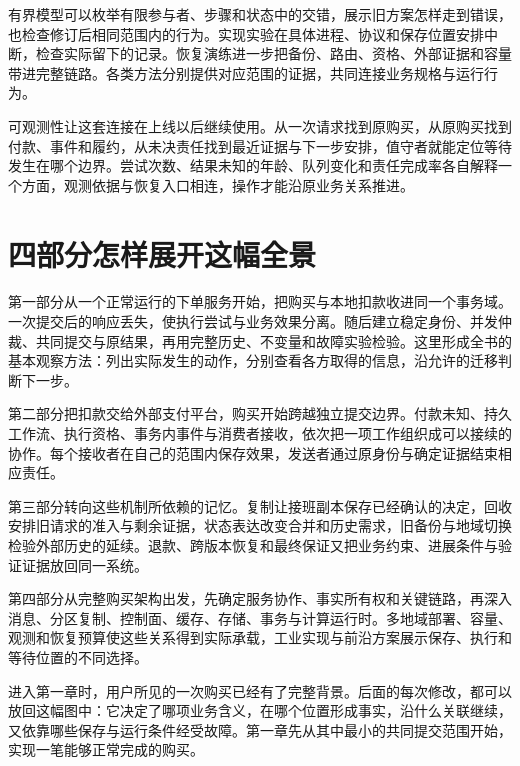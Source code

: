 有界模型可以枚举有限参与者、步骤和状态中的交错，展示旧方案怎样走到错误，也检查修订后相同范围内的行为。实现实验在具体进程、协议和保存位置安排中断，检查实际留下的记录。恢复演练进一步把备份、路由、资格、外部证据和容量带进完整链路。各类方法分别提供对应范围的证据，共同连接业务规格与运行行为。

可观测性让这套连接在上线以后继续使用。从一次请求找到原购买，从原购买找到付款、事件和履约，从未决责任找到最近证据与下一步安排，值守者就能定位等待发生在哪个边界。尝试次数、结果未知的年龄、队列变化和责任完成率各自解释一个方面，观测依据与恢复入口相连，操作才能沿原业务关系推进。

\section*{四部分怎样展开这幅全景}

第一部分从一个正常运行的下单服务开始，把购买与本地扣款收进同一个事务域。一次提交后的响应丢失，使执行尝试与业务效果分离。随后建立稳定身份、并发仲裁、共同提交与原结果，再用完整历史、不变量和故障实验检验。这里形成全书的基本观察方法：列出实际发生的动作，分别查看各方取得的信息，沿允许的迁移判断下一步。

第二部分把扣款交给外部支付平台，购买开始跨越独立提交边界。付款未知、持久工作流、执行资格、事务内事件与消费者接收，依次把一项工作组织成可以接续的协作。每个接收者在自己的范围内保存效果，发送者通过原身份与确定证据结束相应责任。

第三部分转向这些机制所依赖的记忆。复制让接班副本保存已经确认的决定，回收安排旧请求的准入与剩余证据，状态表达改变合并和历史需求，旧备份与地域切换检验外部历史的延续。退款、跨版本恢复和最终保证又把业务约束、进展条件与验证证据放回同一系统。

第四部分从完整购买架构出发，先确定服务协作、事实所有权和关键链路，再深入消息、分区复制、控制面、缓存、存储、事务与计算运行时。多地域部署、容量、观测和恢复预算使这些关系得到实际承载，工业实现与前沿方案展示保存、执行和等待位置的不同选择。

进入第一章时，用户所见的一次购买已经有了完整背景。后面的每次修改，都可以放回这幅图中：它决定了哪项业务含义，在哪个位置形成事实，沿什么关联继续，又依靠哪些保存与运行条件经受故障。第一章先从其中最小的共同提交范围开始，实现一笔能够正常完成的购买。

\FloatBarrier
\clearpage
\endgroup
